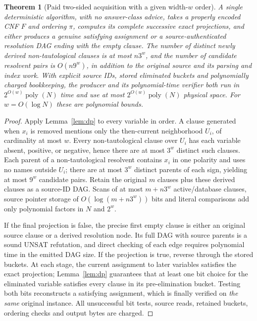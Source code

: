 \documentclass[11pt]{article}
\newtheorem{theorem}{Theorem}
\begin{document}
\begin{theorem}[Paid two-sided acquisition with a given width-$w$ order]\label{thm:bucket}
A single deterministic algorithm, with no answer-class advice, takes a properly encoded CNF $F$ and ordering $\pi$, computes its complete successive exact projections, and either produces a genuine satisfying assignment or a source-authenticated resolution DAG ending with the empty clause. The number of distinct newly derived non-tautological clauses is at most $n3^w$, and the number of candidate resolvent pairs is $O(n9^w)$, in addition to the original source and its parsing and index work. With explicit source IDs, stored eliminated buckets and polynomially charged bookkeeping, the producer and its polynomial-time verifier both run in $2^{O(w)}\operatorname{poly}(N)$ time and use at most $2^{O(w)}\operatorname{poly}(N)$ physical space. For $w=O(\log N)$ these are polynomial bounds.
\end{theorem}
\begin{proof}
Apply Lemma~\ref{lem:dp} to every variable in order. A clause generated when $x_i$ is removed mentions only the then-current neighborhood $U_i$, of cardinality at most $w$. Every non-tautological clause over $U_i$ has each variable absent, positive, or negative, hence there are at most $3^w$ distinct such clauses. Each parent of a non-tautological resolvent contains $x_i$ in one polarity and uses no names outside $U_i$; there are at most $3^w$ distinct parents of each sign, yielding at most $9^w$ candidate pairs. Retain the original $m$ clauses plus these derived clauses as a source-ID DAG. Scans of at most $m+n3^w$ active/database clauses, source pointer storage of $O(\log(m+n3^w))$ bits and literal comparisons add only polynomial factors in $N$ and $2^w$.

If the final projection is false, the precise first empty clause is either an original source clause or a derived resolution node. Its full DAG with source parents is a sound UNSAT refutation, and direct checking of each edge requires polynomial time in the emitted DAG size. If the projection is true, reverse through the stored buckets. At each stage, the current assignment to later variables satisfies the exact projection; Lemma~\ref{lem:dp} guarantees that at least one bit choice for the eliminated variable satisfies every clause in its pre-elimination bucket. Testing both bits reconstructs a satisfying assignment, which is finally verified on \emph{the same} original instance. All unsuccessful bit tests, source reads, retained buckets, ordering checks and output bytes are charged.
\end{proof}
\end{document}
